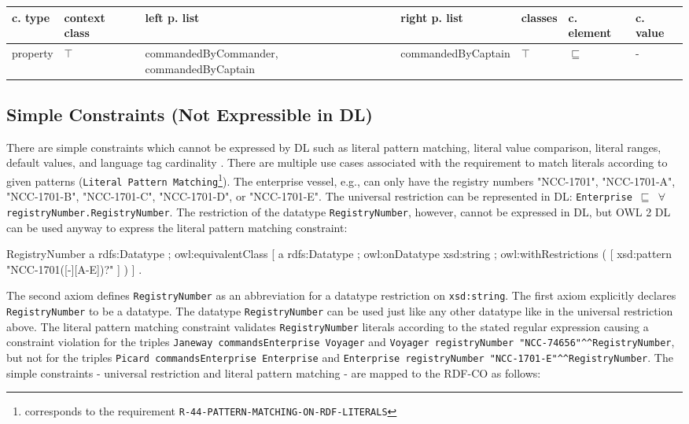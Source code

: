 \documentclass{llncs}
\newcommand{\ms}[1]{\texttt{#1}}
\newenvironment{gcotable}{
  \scriptsize
  \sffamily
  \vspace{0cm}
	\begin{center}
  \begin{tabular}{l|l|l|l|l|l|l}
  \hline
  \textbf{c. type} & \textbf{context class} & \textbf{left p. list} & \textbf{right p. list} & \textbf{classes} & \textbf{c. element} & \textbf{c. value} \\
  \hline

}{
  \hline
  \end{tabular}
	\end{center}
}
\begin{document}
\begin{gcotable}
property & $\top$ & commandedByCommander, commandedByCaptain & commandedByCaptain & $\top$ & $\sqsubseteq$ & - \\
\end{gcotable}

\subsection{Simple Constraints (Not Expressible in DL)}

There are simple constraints which cannot be expressed by DL such as literal pattern matching, literal value comparison, literal ranges, default values, and language tag cardinality \cite{BoschNolleAcarEckert2015}.
There are multiple use cases associated with the requirement to match literals according to given patterns (\ms{Literal Pattern Matching}\footnote{corresponds to the requirement \ms{R-44-PATTERN-MATCHING-ON-RDF-LITERALS}}).
The enterprise vessel, e.g.,  can only have the registry numbers "NCC-1701", "NCC-1701-A", "NCC-1701-B", "NCC-1701-C", "NCC-1701-D", or "NCC-1701-E".
The universal restriction can be represented in DL:
\ms{Enterprise $\sqsubseteq$ $\forall$ registryNumber.RegistryNumber}.
The restriction of the datatype \ms{RegistryNumber}, however, cannot be expressed in DL, but OWL 2 DL can be used anyway to express the literal pattern matching constraint:

\begin{ex}
RegistryNumber
    a rdfs:Datatype ; owl:equivalentClass [ a rdfs:Datatype ;
        owl:onDatatype xsd:string ;
        owl:withRestrictions ( [ xsd:pattern "NCC-1701([-][A-E])?" ] ) ] .
\end{ex}

The second axiom defines \ms{RegistryNumber} as an abbreviation for a datatype restriction on \ms{xsd:string}. 
The first axiom explicitly declares \ms{RegistryNumber} to be a datatype. 
The datatype \ms{RegistryNumber} can be used just like any other datatype like in the universal restriction above.
The literal pattern matching constraint validates \ms{RegistryNumber} literals according to the stated regular expression causing a constraint violation for the triples 
\ms{Janeway commandsEnterprise Voyager} and \ms{Voyager registryNumber "NCC-74656"\textasciicircum{}\textasciicircum{}RegistryNumber}, 
but not for the triples \ms{Picard commandsEnterprise Enterprise} and \ms{Enterprise registryNumber "NCC-1701-E"\textasciicircum{}\textasciicircum{}RegistryNumber}.
The simple constraints - universal restriction and literal pattern matching - are mapped to the RDF-CO as follows:
\end{document}
